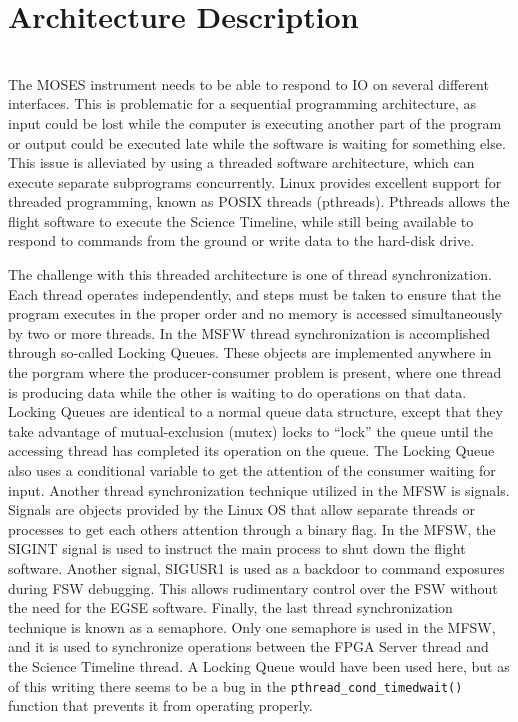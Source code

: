 %
\section{Architecture Description}
\hrulefill
\\
The MOSES instrument needs to be able to respond to IO on several different interfaces. This is problematic for a sequential programming architecture, as input could be lost while the computer is executing another part of the program or output could be executed late while the software is waiting for something else. This issue is alleviated by using a threaded software architecture, which can execute separate subprograms concurrently. Linux provides excellent support for threaded programming, known as POSIX threads (pthreads). Pthreads allows the flight software to execute the Science Timeline, while still being available to respond to commands from the ground or write data to the hard-disk drive. \par 
The challenge with this threaded architecture is one of thread synchronization. Each thread operates independently, and steps must be taken to ensure that the program executes in the proper order and no memory is accessed simultaneously by two or more threads. In the MSFW thread synchronization is accomplished through so-called Locking Queues. These objects are implemented anywhere in the porgram where the producer-consumer problem is present, where one thread is producing data while the other is waiting to do operations on that data. Locking Queues are identical to a normal queue data structure, except that they take advantage of mutual-exclusion (mutex) locks to ``lock'' the queue until the accessing thread has completed its operation on the queue. The Locking Queue also uses a conditional variable to get the attention of the consumer waiting for input.
Another thread synchronization technique utilized in the MFSW is signals. Signals are objects provided by the Linux OS that allow separate threads or processes to get each others attention through a binary flag. In the MFSW, the SIGINT signal is used to instruct the main process to shut down the flight software. Another signal, SIGUSR1 is used as a backdoor to command exposures during FSW debugging. This allows rudimentary control over the FSW without the need for the EGSE software.
Finally, the last thread synchronization technique is known as a semaphore. Only one semaphore is used in the MFSW, and it is used to synchronize operations between the FPGA Server thread and the Science Timeline thread. A Locking Queue would have been used here, but as of this writing there seems to be a bug in the  \texttt{pthread\_cond\_timedwait()} function that prevents it from operating properly. \par 
